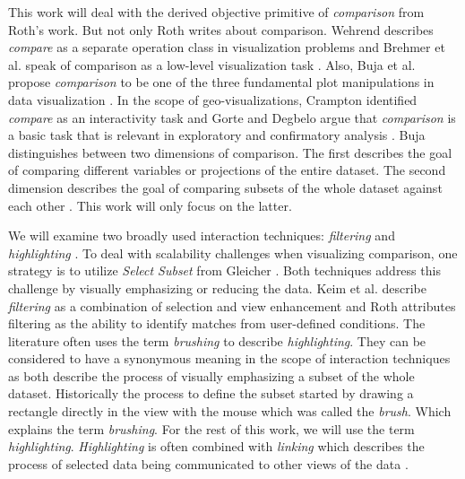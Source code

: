 This work will deal with the derived objective primitive of \textit{comparison} from Roth's work. But not only Roth writes about comparison.
Wehrend describes \textit{compare} as a separate operation class in visualization problems \citep{Wehrend.1990} and Brehmer et al. speak
of comparison as a low-level visualization task \citep*{Brehmer.2013}. Also, Buja et al. propose \textit{comparison} to be one of the three
fundamental plot manipulations in data visualization \citep*{Buja.1996}. In the scope of geo-visualizations, Crampton identified \textit{compare}
as an interactivity task \citep{Crampton.2002} and Gorte and Degbelo argue that \textit{comparison} is a basic task that is relevant in
exploratory and confirmatory analysis \citep{Gorte.2022}. Buja distinguishes between two dimensions of comparison. The first describes the
goal of comparing different variables or projections of the entire dataset. The second dimension describes the goal of comparing subsets
of the whole dataset against each other \citep*{Buja.1996}. This work will only focus on the latter.

We will examine two broadly used interaction techniques: \textit{filtering} and \textit{highlighting} \citep*{Keim.2005,Roth.2013}.
To deal with scalability challenges when visualizing comparison, one strategy is to utilize \textit{Select Subset} from Gleicher
\citep*{Gleicher.2018}. Both techniques address this challenge by visually emphasizing or reducing the data. Keim et al. describe
\textit{filtering} as a combination of selection and view enhancement and Roth attributes filtering as the ability to identify
matches from user-defined conditions. The literature often uses the term \textit{brushing} to describe \textit{highlighting}. They
can be considered to have a synonymous meaning in the scope of interaction techniques as both describe the process of visually
emphasizing a subset of the whole dataset. Historically the process to define the subset started by drawing a rectangle directly
in the view with the mouse which was called the \textit{brush}. Which explains the term \textit{brushing}. For the rest of this work,
we will use the term \textit{highlighting}. \textit{Highlighting} is often combined with \textit{linking} which describes the process
of selected data being communicated to other views of the data \citep*{Keim.2005,Andrienko.2020}.

